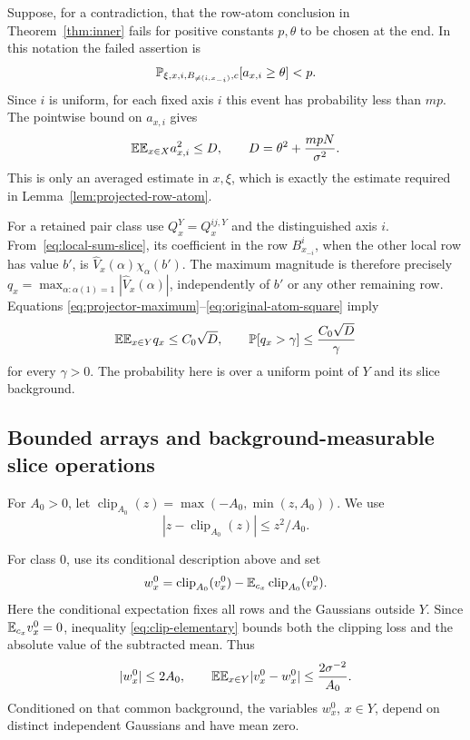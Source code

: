Suppose, for a contradiction, that the row-atom conclusion in
Theorem~\ref{thm:inner} fails for positive constants $p,\theta$ to be
chosen at the end. In this notation the failed assertion is
\[
 \mathbb P_{\xi,x,i,B_{\ne(i,x_{-i})},c}[a_{x,i}\ge\theta]<p.
\]
Since $i$ is uniform, for each fixed axis $i$ this event has probability
less than $mp$. The pointwise bound on $a_{x,i}$ gives
\begin{equation}\label{eq:original-atom-square}
 \mathbb E\mathbb E_{x\in X}a_{x,i}^2\le D,
 \qquad D=\theta^2+\frac{mpN}{\sigma^2}.
\end{equation}
This is only an averaged estimate in $x,\xi$, which is exactly the
estimate required in Lemma~\ref{lem:projected-row-atom}.

For a retained pair class use $Q_x^Y=Q_x^{ij,Y}$ and the distinguished
axis $i$. From~\eqref{eq:local-sum-slice}, its coefficient in the
row $B^i_{x_{-i}}$, when the other local row has value $b'$, is
$\widehat V_x(\alpha)\chi_\alpha(b')$. The maximum magnitude is
therefore precisely
$q_x=\max_{\alpha:\alpha(1)=1}|\widehat V_x(\alpha)|$, independently
of $b'$ or any other remaining row. Equations
\eqref{eq:projector-maximum}--\eqref{eq:original-atom-square} imply
\begin{equation}\label{eq:slice-atom-probability}
 \mathbb E\mathbb E_{x\in Y}q_x\le C_0\sqrt D,
 \qquad
 \mathbb P[q_x>\gamma]\le\frac{C_0\sqrt D}{\gamma}
\end{equation}
for every $\gamma>0$. The probability here is over a uniform point
of $Y$ and its slice background.

\subsection{Bounded arrays and background-measurable slice operations}

For $A_0>0$, let $\operatorname{clip}_{A_0}(z)=
\max(-A_0,\min(z,A_0))$. We use
\begin{equation}\label{eq:clip-elementary}
 |z-\operatorname{clip}_{A_0}(z)|\le z^2/A_0.
\end{equation}

For class $0$, use its conditional description above and set
\[
 w^0_x=\operatorname{clip}_{A_0}(v^0_x)
       -\mathbb E_{c_x}\operatorname{clip}_{A_0}(v^0_x).
\]
Here the conditional expectation fixes all rows and the Gaussians
outside $Y$. Since $\mathbb E_{c_x}v^0_x=0$, inequality
\eqref{eq:clip-elementary} bounds both the clipping loss and the
absolute value of the subtracted mean. Thus
\begin{equation}\label{eq:class-zero-processing}
 |w^0_x|\le2A_0,\qquad
 \mathbb E\mathbb E_{x\in Y}|v^0_x-w^0_x|\le\frac{2\sigma^{-2}}{A_0}.
\end{equation}
Conditioned on that common background, the variables $w^0_x$, $x\in Y$,
depend on distinct independent Gaussians and have mean zero.

